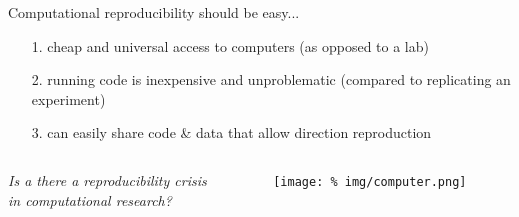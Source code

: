 \begin{frame}{Computational reproducibility should be easy...}

  \vspace{0.7cm}
  
  \begin{itemize}[leftmargin=1.2cm, rightmargin=1cm]

    \itemsep10pt

  \item[1.] cheap and universal access to computers (as opposed to a lab)
  \item[2.] running code is inexpensive and unproblematic (compared to replicating an experiment)
  \item[3.] can easily share code \& data that allow direction reproduction
    
    
  \end{itemize}


  

  \begin{columns}
    \begin{column}{.625\textwidth}
      \minipage[c][0.45\textheight][s]{\columnwidth}

      \vspace{1.2cm}
      \begin{center}
        \textit{Is a there a reproducibility crisis\\ in computational research?}
      \end{center}        
      
      \endminipage      
    \end{column}
    \begin{column}{.375\textwidth}
      \vspace{-1cm}
      \begin{figure}
        \centering
        \texttt{[image: \%
          img/computer.png]} %
      \end{figure}
      
      
      
    \end{column}
  \end{columns}
  




  
  
\end{frame}



